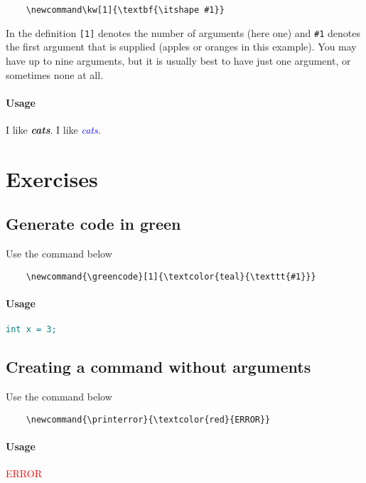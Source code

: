\documentclass{article}
\newcommand\kw[1]{\textbf{\itshape #1}}
\newcommand\blue[1]{\textcolor{blue}{\itshape #1}}
\newcommand{\greencode}[1]{\textcolor{teal}{\texttt{#1}}}
\newcommand{\printerror}{\textcolor{red}{ERROR}}
\begin{document}
\begin{verbatim}
    \newcommand\kw[1]{\textbf{\itshape #1}}
\end{verbatim}

In the definition \texttt{[1]} denotes the number of arguments (here one) and \texttt{\#1} denotes the first argument that is supplied (apples or oranges in this example). You may have up to nine arguments, but it is usually best to have just one argument, or sometimes none at all.

\paragraph{Usage} I like \kw{cats}. I like \blue{cats}.

\section{Exercises}
\subsection{Generate code in green}
Use the command below

\begin{verbatim}
    \newcommand{\greencode}[1]{\textcolor{teal}{\texttt{#1}}}
\end{verbatim}

\paragraph{Usage} \greencode{int x = 3;}

\subsection{Creating a command without arguments}
Use the command below

\begin{verbatim}
    \newcommand{\printerror}{\textcolor{red}{ERROR}}
\end{verbatim}

\paragraph{Usage} \printerror
\end{document}

